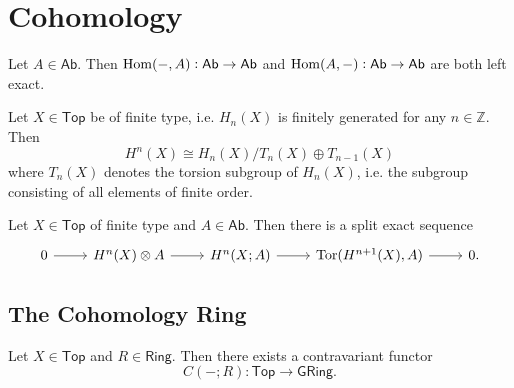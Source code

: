 \section*{Cohomology}

\begin{proposition}
	Let $A \in \mathsf{Ab}$. Then $\operatorname{Hom}(-,A) : \mathsf{Ab} \to \mathsf{Ab}$ and $\operatorname{Hom}(A,-) : \mathsf{Ab} \to \mathsf{Ab}$ are both left exact.
\end{proposition}

\begin{corollary}
	\label{cor:finite_type}
	Let $X \in \mathsf{Top}$ be of finite type, i.e. $H_n(X)$ is finitely generated for any $n \in \mathbb{Z}$. Then
	\begin{equation*}
		H^n(X) \cong H_n(X)/T_n(X) \oplus T_{n - 1}(X)
	\end{equation*}
	\noindent where $T_n(X)$ denotes the torsion subgroup of $H_n(X)$, i.e. the subgroup consisting of all elements of finite order.
\end{corollary}

\begin{theorem}
	Let $X \in \mathsf{Top}$ of finite type and $A \in \mathsf{Ab}$. Then there is a split exact sequence
	\begin{equation*}
		\begin{tikzcd}
			0 \arrow[r] & H^n(X) \otimes A \arrow[r] & H^n(X;A) \arrow[r] & \Tor(H^{n + 1}(X),A) \arrow[r] & 0.
		\end{tikzcd}
	\end{equation*}
\end{theorem}

\subsection*{The Cohomology Ring}

\begin{proposition}
	Let $X \in \mathsf{Top}$ and $R \in \mathsf{Ring}$. Then there exists a contravariant functor
	\begin{equation*}
		C(-;R) : \mathsf{Top} \to \mathsf{GRing}.
	\end{equation*}
\end{proposition}

